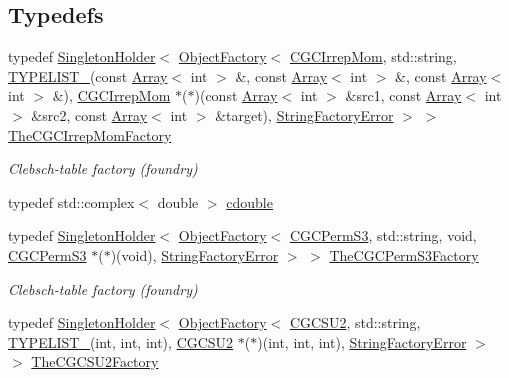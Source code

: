 \subsection*{Typedefs}
\begin{DoxyCompactItemize}
\item 
typedef \mbox{\hyperlink{classUtil_1_1SingletonHolder}{Singleton\+Holder}}$<$ \mbox{\hyperlink{classUtil_1_1ObjectFactory}{Object\+Factory}}$<$ \mbox{\hyperlink{classHadron_1_1CGCIrrepMom}{C\+G\+C\+Irrep\+Mom}}, std\+::string, \mbox{\hyperlink{install_2include_2adat_2typelist_8h_a0309f68a543c5c0994f9edc0e56dc59f}{T\+Y\+P\+E\+L\+I\+S\+T\+\_}}(const \mbox{\hyperlink{classXMLArray_1_1Array}{Array}}$<$ int $>$ \&, const \mbox{\hyperlink{classXMLArray_1_1Array}{Array}}$<$ int $>$ \&, const \mbox{\hyperlink{classXMLArray_1_1Array}{Array}}$<$ int $>$ \&), \mbox{\hyperlink{classHadron_1_1CGCIrrepMom}{C\+G\+C\+Irrep\+Mom}} $\ast$($\ast$)(const \mbox{\hyperlink{classXMLArray_1_1Array}{Array}}$<$ int $>$ \&src1, const \mbox{\hyperlink{classXMLArray_1_1Array}{Array}}$<$ int $>$ \&src2, const \mbox{\hyperlink{classXMLArray_1_1Array}{Array}}$<$ int $>$ \&target), \mbox{\hyperlink{structUtil_1_1StringFactoryError}{String\+Factory\+Error}} $>$ $>$ \mbox{\hyperlink{namespaceHadron_a4657a351a06d86fb997a0765f97e3f13}{The\+C\+G\+C\+Irrep\+Mom\+Factory}}
\begin{DoxyCompactList}\small\item\em Clebsch-\/table factory (foundry) \end{DoxyCompactList}\item 
typedef std\+::complex$<$ double $>$ \mbox{\hyperlink{namespaceHadron_abaab2f90393b8dd8d93060e6ce6568e7}{cdouble}}
\item 
typedef \mbox{\hyperlink{classUtil_1_1SingletonHolder}{Singleton\+Holder}}$<$ \mbox{\hyperlink{classUtil_1_1ObjectFactory}{Object\+Factory}}$<$ \mbox{\hyperlink{classHadron_1_1CGCPermS3}{C\+G\+C\+Perm\+S3}}, std\+::string, void, \mbox{\hyperlink{classHadron_1_1CGCPermS3}{C\+G\+C\+Perm\+S3}} $\ast$($\ast$)(void), \mbox{\hyperlink{structUtil_1_1StringFactoryError}{String\+Factory\+Error}} $>$ $>$ \mbox{\hyperlink{namespaceHadron_a5dba98c73cf8d3f64496a084c7e3d16c}{The\+C\+G\+C\+Perm\+S3\+Factory}}
\begin{DoxyCompactList}\small\item\em Clebsch-\/table factory (foundry) \end{DoxyCompactList}\item 
typedef \mbox{\hyperlink{classUtil_1_1SingletonHolder}{Singleton\+Holder}}$<$ \mbox{\hyperlink{classUtil_1_1ObjectFactory}{Object\+Factory}}$<$ \mbox{\hyperlink{classHadron_1_1CGCSU2}{C\+G\+C\+S\+U2}}, std\+::string, \mbox{\hyperlink{install_2include_2adat_2typelist_8h_a0309f68a543c5c0994f9edc0e56dc59f}{T\+Y\+P\+E\+L\+I\+S\+T\+\_}}(int, int, int), \mbox{\hyperlink{classHadron_1_1CGCSU2}{C\+G\+C\+S\+U2}} $\ast$($\ast$)(int, int, int), \mbox{\hyperlink{structUtil_1_1StringFactoryError}{String\+Factory\+Error}} $>$ $>$ \mbox{\hyperlink{namespaceHadron_a78329899af02f016ab89457f10d6e6ff}{The\+C\+G\+C\+S\+U2\+Factory}}

\end{DoxyCompactItemize}
